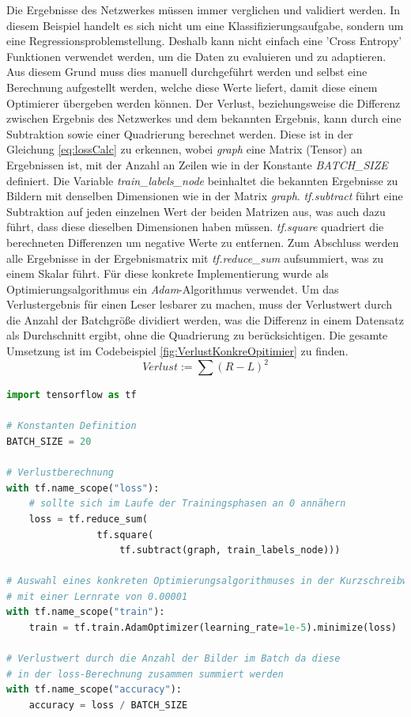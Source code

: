 Die Ergebnisse des Netzwerkes müssen immer verglichen und validiert werden. 
In diesem Beispiel handelt es sich nicht um eine Klassifizierungsaufgabe, sondern um eine Regressionsproblemstellung. 
Deshalb kann nicht einfach eine 'Cross Entropy' Funktionen verwendet werden, um die Daten zu evaluieren und zu adaptieren. 
Aus diesem Grund muss dies manuell durchgeführt werden und selbst eine Berechnung aufgestellt werden, welche diese Werte liefert, damit diese einem Optimierer übergeben werden können. 
Der Verlust, beziehungsweise die Differenz zwischen Ergebnis des Netzwerkes und dem bekannten Ergebnis, kann durch eine Subtraktion sowie einer Quadrierung berechnet werden. 
Diese ist in der Gleichung \ref{eq:lossCalc} zu erkennen, wobei \textit{graph} eine Matrix (Tensor) an Ergebnissen ist, mit der Anzahl an Zeilen wie in der Konstante \textit{BATCH\_SIZE} definiert. 
Die Variable \textit{train\_labels\_node} beinhaltet die bekannten Ergebnisse zu Bildern mit denselben Dimensionen wie in der Matrix \textit{graph}. 
\textit{tf.subtract} führt eine Subtraktion auf jeden einzelnen Wert der beiden Matrizen aus, was auch dazu führt, dass diese dieselben Dimensionen haben müssen. 
\textit{tf.square} quadriert die berechneten Differenzen um negative Werte zu entfernen. 
Zum Abschluss werden alle Ergebnisse in der Ergebnismatrix mit \textit{tf.reduce\_sum} aufsummiert, was zu einem Skalar führt. 
Für diese konkrete Implementierung wurde als Optimierungsalgorithmus ein \textit{Adam}-Algorithmus \cite{DBLP:journals/corr/KingmaB14} verwendet. 
Um das Verlustergebnis für einen Leser lesbarer zu machen, muss der Verlustwert durch die Anzahl der Batchgröße dividiert werden, was die Differenz in einem Datensatz als Durchschnitt ergibt, ohne die Quadrierung zu berücksichtigen. 
Die gesamte Umsetzung ist im Codebeispiel \ref{fig:VerlustKonkreOpitimier} zu finden. 
\begin{equation}
	Verlust := \sum{(R - L)^2}
	\label{eq:lossCalc}
\end{equation}
\begin{lstlisting}[caption={Verlustberechnung, konkreter Opitimierungsalgorithmus, Genauigkeitsberechnung},label=fig:VerlustKonkreOpitimier,captionpos=b,language=Python]
import tensorflow as tf

# Konstanten Definition
BATCH_SIZE = 20

# Verlustberechnung
with tf.name_scope("loss"):
    # sollte sich im Laufe der Trainingsphasen an 0 annähern
    loss = tf.reduce_sum(
    			tf.square(
    				tf.subtract(graph, train_labels_node)))

# Auswahl eines konkreten Optimierungsalgorithmuses in der Kurzschreibweise
# mit einer Lernrate von 0.00001
with tf.name_scope("train"):
    train = tf.train.AdamOptimizer(learning_rate=1e-5).minimize(loss)
    
# Verlustwert durch die Anzahl der Bilder im Batch da diese 
# in der loss-Berechnung zusammen summiert werden
with tf.name_scope("accuracy"):    
    accuracy = loss / BATCH_SIZE
\end{lstlisting}
 
